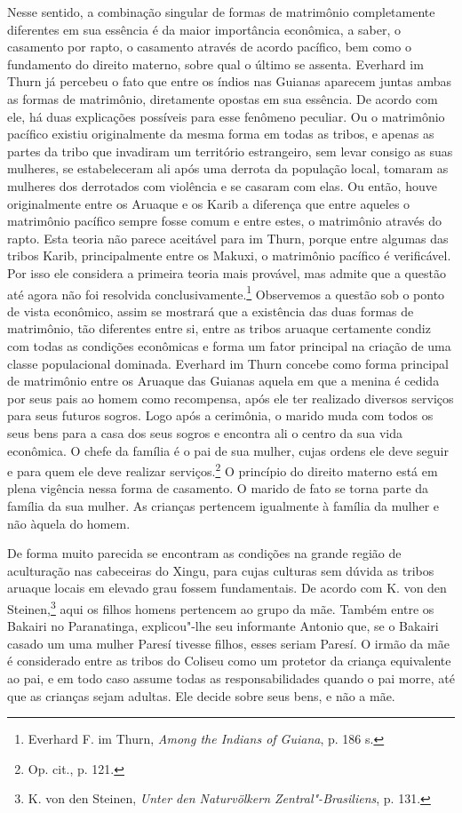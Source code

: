 Nesse sentido, a combinação singular de formas de matrimônio
completamente diferentes em sua essência é da maior importância
econômica, a saber, o casamento por rapto, o casamento através de
acordo pacífico, bem como o fundamento do direito materno, sobre qual o
último se assenta. Everhard im Thurn já percebeu o fato que entre os
índios nas Guianas aparecem juntas ambas as formas de matrimônio,
diretamente opostas em sua essência. De acordo com ele, há duas
explicações possíveis para esse fenômeno peculiar. Ou o matrimônio
pacífico existiu originalmente da mesma forma em todas as tribos, e
apenas as partes da tribo que invadiram um território estrangeiro, sem
levar consigo as suas mulheres, se estabeleceram ali após uma derrota
da população local, tomaram as mulheres dos derrotados com violência e
se casaram com elas. Ou então, houve originalmente entre os Aruaque e os
Karib a diferença que entre aqueles o matrimônio pacífico sempre fosse
comum e entre estes, o matrimônio através do rapto. Esta teoria não
parece aceitável para im Thurn, porque entre algumas das tribos Karib,
principalmente entre os Makuxi, o matrimônio pacífico é verificável. Por
isso ele considera a primeira teoria mais provável, mas admite que a
questão até agora não foi resolvida conclusivamente.\footnote{Everhard
  F. im Thurn, \emph{Among the Indians of Guiana}, p. 186 s.}
Observemos a questão sob o ponto de vista econômico, assim se mostrará
que a existência das duas formas de matrimônio, tão diferentes entre si,
entre as tribos aruaque certamente condiz com todas as condições
econômicas e forma um fator principal na criação de uma classe
populacional dominada. Everhard im Thurn concebe como forma principal
de matrimônio entre os Aruaque das Guianas aquela em que a menina é
cedida por seus pais ao homem como recompensa, após ele ter realizado
diversos serviços para seus futuros sogros. Logo após a cerimônia, o
marido muda com todos os seus bens para a casa dos seus sogros e
encontra ali o centro da sua vida econômica. O chefe da família é o pai
de sua mulher, cujas ordens ele deve seguir e para quem ele deve
realizar serviços.\footnote{Op. cit., p. 121.} O princípio do direito
materno está em plena vigência nessa forma de casamento. O marido de
fato se torna parte da família da sua mulher. As crianças pertencem
igualmente à família da mulher e não àquela do homem.

De forma muito parecida se encontram as condições na grande região de
aculturação nas cabeceiras do Xingu, para cujas culturas sem dúvida as
tribos aruaque locais em elevado grau fossem fundamentais. De acordo com
K. von den Steinen,\footnote{K. von den Steinen, \emph{Unter den
  Naturvölkern Zentral"-Brasiliens}, p. 131.} aqui os filhos homens
pertencem ao grupo da mãe. Também entre os Bakairi no Paranatinga,
explicou"-lhe seu informante Antonio que, se o Bakairi casado um uma
mulher Paresí tivesse filhos, esses seriam Paresí. O irmão da mãe é
considerado entre as tribos do Coliseu como um protetor da criança
equivalente ao pai, e em todo caso assume todas as responsabilidades
quando o pai morre, até que as crianças sejam adultas. Ele decide sobre
seus bens, e não a mãe.

